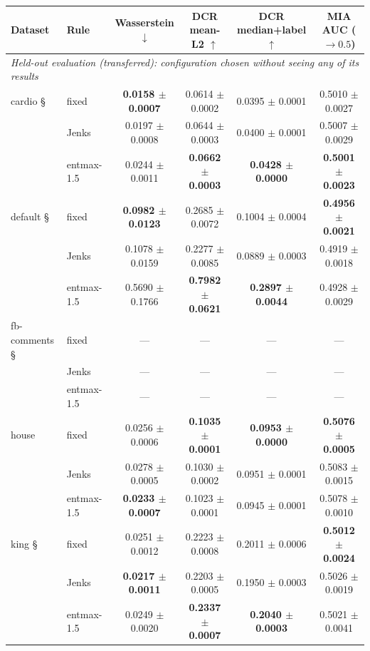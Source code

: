 \begin{table}[t]
\centering\small
\begin{tabular}{llcccc}
\toprule
Dataset & Rule & Wasserstein $\downarrow$ & DCR mean-L2 $\uparrow$ & DCR median+label $\uparrow$ & MIA AUC ($\to 0.5$) \\
\midrule
\multicolumn{6}{l}{\textit{Held-out evaluation (transferred): configuration chosen without seeing any of its results}} \\
cardio § & fixed & \textbf{0.0158 $\pm$ 0.0007} & 0.0614 $\pm$ 0.0002 & 0.0395 $\pm$ 0.0001 & 0.5010 $\pm$ 0.0027 \\
 & Jenks & 0.0197 $\pm$ 0.0008 & 0.0644 $\pm$ 0.0003 & 0.0400 $\pm$ 0.0001 & 0.5007 $\pm$ 0.0029 \\
 & entmax-1.5 & 0.0244 $\pm$ 0.0011 & \textbf{0.0662 $\pm$ 0.0003} & \textbf{0.0428 $\pm$ 0.0000} & \textbf{0.5001 $\pm$ 0.0023} \\
\addlinespace
default § & fixed & \textbf{0.0982 $\pm$ 0.0123} & 0.2685 $\pm$ 0.0072 & 0.1004 $\pm$ 0.0004 & \textbf{0.4956 $\pm$ 0.0021} \\
 & Jenks & 0.1078 $\pm$ 0.0159 & 0.2277 $\pm$ 0.0085 & 0.0889 $\pm$ 0.0003 & 0.4919 $\pm$ 0.0018 \\
 & entmax-1.5 & 0.5690 $\pm$ 0.1766 & \textbf{0.7982 $\pm$ 0.0621} & \textbf{0.2897 $\pm$ 0.0044} & 0.4928 $\pm$ 0.0029 \\
\addlinespace
fb-comments § & fixed & --- & --- & --- & --- \\
 & Jenks & --- & --- & --- & --- \\
 & entmax-1.5 & --- & --- & --- & --- \\
\addlinespace
house & fixed & 0.0256 $\pm$ 0.0006 & \textbf{0.1035 $\pm$ 0.0001} & \textbf{0.0953 $\pm$ 0.0000} & \textbf{0.5076 $\pm$ 0.0005} \\
 & Jenks & 0.0278 $\pm$ 0.0005 & 0.1030 $\pm$ 0.0002 & 0.0951 $\pm$ 0.0001 & 0.5083 $\pm$ 0.0015 \\
 & entmax-1.5 & \textbf{0.0233 $\pm$ 0.0007} & 0.1023 $\pm$ 0.0001 & 0.0945 $\pm$ 0.0001 & 0.5078 $\pm$ 0.0010 \\
\addlinespace
king § & fixed & 0.0251 $\pm$ 0.0012 & 0.2223 $\pm$ 0.0008 & 0.2011 $\pm$ 0.0006 & \textbf{0.5012 $\pm$ 0.0024} \\
 & Jenks & \textbf{0.0217 $\pm$ 0.0011} & 0.2203 $\pm$ 0.0005 & 0.1950 $\pm$ 0.0003 & 0.5026 $\pm$ 0.0019 \\
 & entmax-1.5 & 0.0249 $\pm$ 0.0020 & \textbf{0.2337 $\pm$ 0.0007} & \textbf{0.2040 $\pm$ 0.0003} & 0.5021 $\pm$ 0.0041 \\

\end{tabular}
\end{table}
